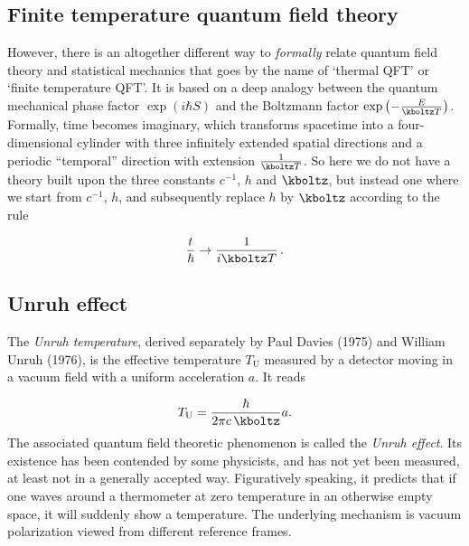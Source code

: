 \documentclass{scrartcl}
\begin{document}
\subsection*{Finite temperature quantum field theory}

However, there is an altogether different way to \emph{formally} relate quantum field theory and statistical mechanics that goes by the name of \enquote*{thermal QFT} or \enquote*{finite temperature QFT}. It is based on a deep analogy between the quantum mechanical phase factor $\exp\left(i \hbar S\right)$ and the Boltzmann factor $\exp\left(-\frac{E}{\kboltz T}\right)$. 
Formally, time becomes imaginary, which transforms spacetime into a four-dimensional cylinder with three infinitely extended spatial directions and a periodic \enquote{temporal} direction with extension
$\frac{1}{\kboltz T}$.
So here we do not have a theory built upon the three constants $c^{-1}$, $h$ and $\kboltz$, but instead one where we start from $c^{-1}$, $h$, and subsequently replace $h$ by $\kboltz$ according to the rule

\begin{equation*}
  \frac{t}{\hbar} \rightarrow \frac{1}{i \kboltz T}\,.
\end{equation*}




\subsection*{Unruh effect}

The \emph{Unruh temperature}, derived separately by Paul Davies (1975) and William Unruh (1976), is the effective temperature $T_{\text{U}}$ measured by a detector moving in a vacuum field with a uniform acceleration $a$. It reads

\begin{equation*}\label{eq:Unruh}
  T_{\text{U}}=\frac{\hbar}{2 \pi c\, \kboltz} a.
\end{equation*}
%
The associated quantum field theoretic phenomenon is called the \emph{Unruh effect}. Its existence has been contended by some physicists, and has not yet been measured, at least not in a generally accepted way. Figuratively speaking, it predicts that if one waves around a thermometer at zero temperature in an otherwise empty space, it will suddenly show a temperature. The underlying mechanism is vacuum polarization viewed from different reference frames.



\end{document}
